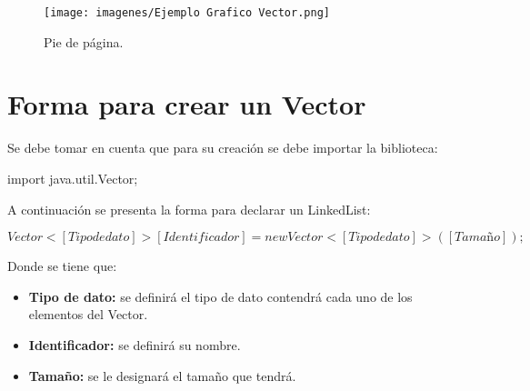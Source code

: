 \documentclass[12pt, letterpaper]{article} %
\begin{document}
\begin{figure}[h]
    \centering
    \texttt{[image: imagenes/Ejemplo Grafico Vector.png]}
    \caption{Pie de página.}
    \label{fig:vector}
\end{figure}

\section*{Forma para crear un Vector}
Se debe tomar en cuenta que para su creación se debe importar la biblioteca:
\begin{center}
    import java.util.Vector;
\end{center}
A continuación se presenta la forma para declarar un LinkedList:
\begin{center}
    $Vector<[Tipo de dato]> [Identificador] = new Vector<[Tipo de dato]>([Tamaño]);$
\end{center}

Donde se tiene que:
\begin{itemize}
    \item \textbf{Tipo de dato:} se definirá el tipo de dato contendrá cada uno de los elementos del Vector.
    \item \textbf{Identificador:} se definirá su nombre.
    \item \textbf{Tamaño:} se le designará el tamaño que tendrá.
\end{itemize}
\end{document}
